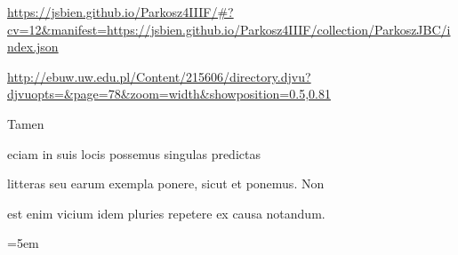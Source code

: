 
\newParkoszpage

{
  \url{https://jsbien.github.io/Parkosz4IIIF/\#?cv=12&manifest=https://jsbien.github.io/Parkosz4IIIF/collection/ParkoszJBC/index.json}
   
\url{http://ebuw.uw.edu.pl/Content/215606/directory.djvu?djvuopts=&page=78&zoom=width&showposition=0.5,0.81}
}

\bigskip

\obeylines
\mono



\fullpreviouslines


{
\color{blue}

Tamen

eciam in suis locis possemus singulas predictas
}


\fulllines

litteras seu earum exempla ponere, sicut et ponemus. Non

est enim vicium idem pluries repetere ex causa notandum.



\def\splitverse{\advance\plineno by 1\psublineno=0\everypar{\advance\psublineno by 1\llap{\textcolor{green}{\the\ppageno-\ifnum\plineno<10 0\fi\the \plineno-\the\psublineno \ }}\hskip5em}}

\def\fullverselines{\everypar{\advance\plineno by 1\llap{\the\ppageno-\ifnum\plineno<10 0\fi\the \plineno \hskip 1.5em}\hskip5em}}


\def\newverse{\advance\plineno by 1\psublineno=0\hskip10em}
\def\newversesubline{\hskip\indentV}
\def\newverseline{\advance\plineno by 1\psublineno=0}
\newdimen\indentV
\newdimen\indentVt
\indentV=5em
\def\indentVerse{\hskip\indentV{}}
\def\indentVerseTotal{\hskip\indentVt{}}


